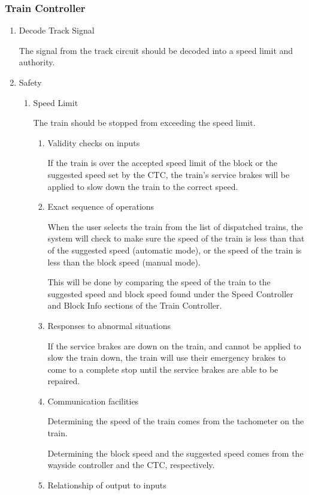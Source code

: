 \documentclass[11pt]{article}
\begin{document}
\subsubsection{Train Controller}
\label{sec-3-1-5}
\begin{enumerate}
\item Decode Track Signal
\label{sec-3-1-5-1}

The signal from the track circuit should be decoded into a speed limit and authority.
\item Safety
\label{sec-3-1-5-2}
\begin{enumerate}
\item Speed Limit
\label{sec-3-1-5-2-1}

The train should be stopped from exceeding the speed limit.
\begin{enumerate}
\item Validity checks on inputs
\label{sec-3-1-5-2-1-1}

If the train is over the accepted speed limit of the block or the suggested speed set by the CTC, the train's service brakes will be applied to slow down the train to the correct speed. 
\item Exact sequence of operations
\label{sec-3-1-5-2-1-2}

When the user selects the train from the list of dispatched trains, the system will check to make sure the speed of the train is less than that of the suggested speed (automatic mode), or the speed of the train is less than the block speed (manual mode).

This will be done by comparing the speed of the train to the suggested speed and block speed found under the Speed Controller and Block Info sections of the Train Controller. 
\item Responses to abnormal situations
\label{sec-3-1-5-2-1-3}

If the service brakes are down on the train, and cannot be applied to slow the train down, the train will use their emergency brakes to come to a complete stop until the service brakes are able to be repaired.  
\item Communication facilities
\label{sec-3-1-5-2-1-4}

Determining the speed of the train comes from the tachometer on the train.

Determining the block speed and the suggested speed comes from the wayside controller and the CTC, respectively. 
\item Relationship of output to inputs
\label{sec-3-1-5-2-1-5}


\end{enumerate}
\end{enumerate}
\end{enumerate}
\end{document}
